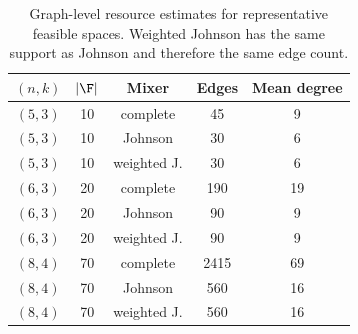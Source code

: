 \begin{table}[t]
\centering
\caption{Graph-level resource estimates for representative feasible spaces. Weighted Johnson has the same support as Johnson and therefore the same edge count. }
\label{tab:graph-resources}
\begin{tabular}{ccccc}
\toprule
$(n,k)$ & $|\F|$ & Mixer & Edges & Mean degree\\
\midrule
$(5,3)$ & 10 & complete & 45 & 9\\
$(5,3)$ & 10 & Johnson & 30 & 6\\
$(5,3)$ & 10 & weighted J. & 30 & 6\\
$(6,3)$ & 20 & complete & 190 & 19\\
$(6,3)$ & 20 & Johnson & 90 & 9\\
$(6,3)$ & 20 & weighted J. & 90 & 9\\
$(8,4)$ & 70 & complete & 2415 & 69\\
$(8,4)$ & 70 & Johnson & 560 & 16\\
$(8,4)$ & 70 & weighted J. & 560 & 16\\
\bottomrule
\end{tabular}
\end{table}
